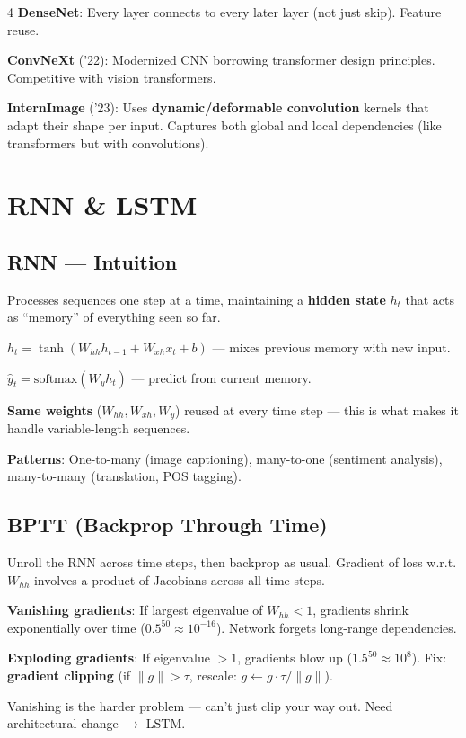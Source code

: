 \documentclass[6pt,landscape,a4paper]{extarticle}
\begin{document}
\begin{multicols}{4}
\textbf{DenseNet}: Every layer connects to every later layer (not just skip). Feature reuse.

\textbf{ConvNeXt} ('22): Modernized CNN borrowing transformer design principles. Competitive with vision transformers.

\textbf{InternImage} ('23): Uses \textbf{dynamic/deformable convolution} kernels that adapt their shape per input. Captures both global and local dependencies (like transformers but with convolutions).

\section{RNN \& LSTM}

\subsection{RNN --- Intuition}
Processes sequences one step at a time, maintaining a \textbf{hidden state} $h_t$ that acts as ``memory'' of everything seen so far.

$h_t = \tanh(W_{hh}h_{t-1} + W_{xh}x_t + b)$ --- mixes previous memory with new input.

$\hat{y}_t = \text{softmax}(W_y h_t)$ --- predict from current memory.

\textbf{Same weights} ($W_{hh}, W_{xh}, W_y$) reused at every time step --- this is what makes it handle variable-length sequences.

\textbf{Patterns}: One-to-many (image captioning), many-to-one (sentiment analysis), many-to-many (translation, POS tagging).

\subsection{BPTT (Backprop Through Time)}
Unroll the RNN across time steps, then backprop as usual. Gradient of loss w.r.t. $W_{hh}$ involves a product of Jacobians across all time steps.

\textbf{Vanishing gradients}: If largest eigenvalue of $W_{hh} < 1$, gradients shrink exponentially over time ($0.5^{50} \approx 10^{-16}$). Network forgets long-range dependencies.

\textbf{Exploding gradients}: If eigenvalue $> 1$, gradients blow up ($1.5^{50} \approx 10^{8}$). Fix: \textbf{gradient clipping} (if $\|g\| > \tau$, rescale: $g \leftarrow g \cdot \tau/\|g\|$).

Vanishing is the harder problem --- can't just clip your way out. Need architectural change $\to$ LSTM.


\end{multicols}
\end{document}
